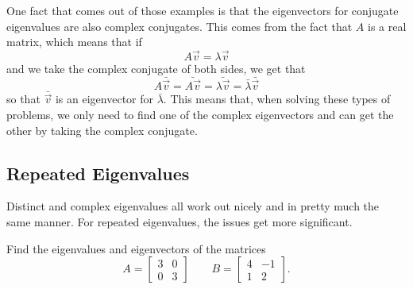 One fact that comes out of those examples is that the eigenvectors for conjugate eigenvalues are also complex conjugates. This comes from the fact that $A$ is a real matrix, which means that if
\[ A\vec{v} = \lambda \vec{v} \] and we take the complex conjugate of both sides, we get that
\[ A\bar{\vec{v}} = \bar{A\vec{v}} = \bar{\lambda\vec{v}} = \bar{\lambda}\bar{\vec{v}} \] so that $\bar{\vec{v}}$ is an eigenvector for $\bar{\lambda}$. This means that, when solving these types of problems, we only need to find one of the complex eigenvectors and can get the other by taking the complex conjugate. 

\subsection{Repeated Eigenvalues}

Distinct and complex eigenvalues all work out nicely and in pretty much the same manner. For repeated eigenvalues, the issues get more significant. 

\begin{example}
Find the eigenvalues and eigenvectors of the matrices
\[ A = \begin{bmatrix} 3 & 0 \\ 0 & 3 \end{bmatrix} \qquad B = \begin{bmatrix} 4 & -1 \\ 1 & 2 \end{bmatrix}.\]
\end{example}

